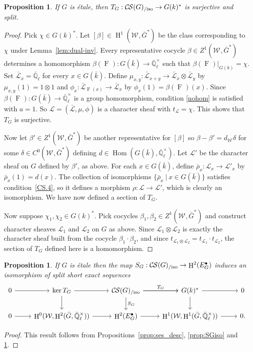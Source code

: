 \documentclass[10pt]{amsart}
\theoremstyle{plain}
\newtheorem{proposition}[theorem]{Proposition}
\theoremstyle{definition}
\theoremstyle{remark}
\newcommand{\EE}{\mathbb{\bar Q}_\ell}
\newcommand{\bFq}{\bar{k}}
\newcommand{\Fq}{k}
\newcommand{\EEx}{\EE^\times}
\newcommand{\Weil}[1]{\mathcal{W}_{#1}}
\newcommand{\Frob}[1]{\operatorname{F}_{#1}}
\DeclareMathOperator{\Hom}{Hom}
\DeclareMathOperator{\Hh}{H}
\newcommand{\tq}{{\ \vert\ }}
\newcommand{\trFrob}[1]{t_{#1}}
\newcommand{\TrFrob}[1]{T_{#1}}
\newcommand{\cs}[1]{{\mathcal{#1}}}
\newcommand{\gcs}[1]{{\mathcal{\bar #1}}}
\newcommand{\CS}{{\mathcal{C\hskip-0.8pt S}}}
\newcommand{\CSiso}[1]{\CS(#1)_{/\text{iso}}}
\newcommand{\bG}{\bar{G}}
\newcommand{\brho}{{\bar\rho}}
\begin{document}
\begin{proposition}\label{prop:sur_etale}
If $G$ is \'etale, then $\TrFrob{G} : \CSiso{G} \to G(\Fq)^*$ is surjective
and split.
\end{proposition}
\begin{proof}
Pick $\chi \in G(\Fq)^*$. 
Let $[\beta]\in \Hh^1(\Weil{},\bG^*)$ be the class corresponding to $\chi$ under Lemma~\ref{lem:dual-inv}.
Every representative cocycle $\beta \in Z^1(\Weil{},\bG^*)$ determines a homomorphism $\beta(\Frob{}) : G(\bFq)\to \EEx$ such that $\beta(\Frob{})\vert_{G(\Fq)} = \chi$.
Set $\gcs{L}_x = \EE$ for every $x\in G(\bFq)$.
Define $\mu_{x,y} : \gcs{L}_{x+y} \to \gcs{L}_x\otimes \gcs{L}_y$ by $\mu_{x,y}(1) = 1 \otimes 1$ and
$\phi_{x} : \gcs{L}_{\Frob{}(x)} \to \gcs{L}_x$ by $\phi_{x}(1) = \beta(\Frob{})(x)$.
Since $\beta(\Frob{}) : G(\bFq) \to \EEx$ is a group homomorphism,
condition \eqref{nohom} is satisfied with $a =1$.
So $\cs{L} = (\gcs{L}, \mu, \phi)$
is a character sheaf with $\trFrob{\cs{L}} = \chi$.
This shows that $\TrFrob{G}$ is surjective.

Now let $\beta' \in Z^1(\Weil{},\bG^*)$ be another representative for $[\beta]$
so $\beta-\beta' = d_{\Weil{}} \delta$ for some $\delta \in C^0(\Weil{},\bG^*)$ defining $d \in \Hom(G(\bFq),\EEx)$.
Let $\cs{L}'$ be the character sheaf on $G$ defined by $\beta'$, as above.
For each $x\in G(\bFq)$, define $\brho_x :\cs{L}_x\to \cs{L}'_x$ by $\brho_x(1) = d(x)$.
The collection of isomorphisms $\{ \brho_x \tq x\in G(\bFq)\}$ satisfies condition~\ref{CS.4}, so it defines a morphism $\rho : \cs{L}\to \cs{L}'$, which is clearly an isomorphism. 
%
We have now defined a section of $\TrFrob{G}$. 

Now suppose $\chi_1, \chi_2 \in G(\Fq)^*$. Pick cocycles $\beta_1,\beta_2\in Z^1(\Weil{},\bG^*)$ and construct character sheaves $\cs{L}_1$ and $\cs{L}_2$ on $G$ as above. Since $\cs{L}_1\otimes \cs{L}_2$ is exactly the character sheaf built from the cocycle $\beta_1\cdot \beta_2$, and since $\trFrob{\cs{L}_1\otimes \cs{L}_2} = \trFrob{\cs{L}_1}\cdot \trFrob{\cs{L}_2}$, the section of $\TrFrob{G}$ defined here is a homomorphism.
\end{proof}

\begin{proposition} \label{prop:etale-iso}
 If $G$ is \'etale then the map $S_G : \CSiso{G}\to \Hh^2(E^\bullet_G)$ induces an isomorphism of split short exact sequences
\[
\begin{tikzcd}
 0 \arrow{r} & \ker \TrFrob{G} \arrow{d} \arrow{r} & \CSiso{G}\arrow{d}{S_G} \arrow{r}{\TrFrob{G}} \arrow{r} & G(\Fq)^* \arrow{d} \arrow{r} & 0\\
  0 \arrow{r} & \Hh^0(\Weil{},\Hh^2({\bar G},\EEx)) \arrow{r} & \Hh^2(E^\bullet_G) \arrow{r} & \Hh^1(\Weil{},\Hh^1({\bar G},\EEx)) \arrow{r} & 0.
 \end{tikzcd}
 \]
\end{proposition}
\begin{proof}
This result follows from Propositions~\ref{prop:ses_desc}, \ref{prop:SGiso} and \ref{prop:sur_etale}.
\end{proof}
\end{document}

